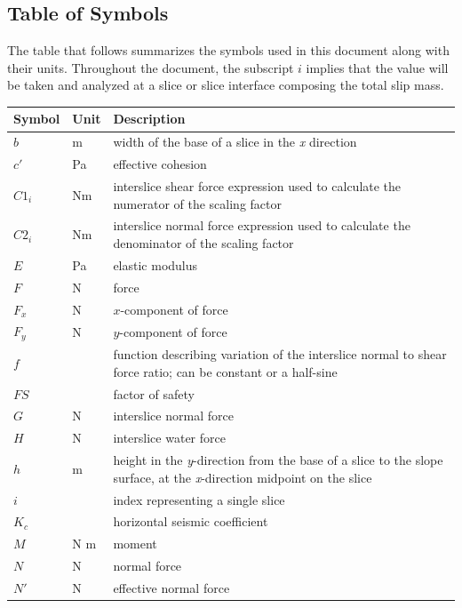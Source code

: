 \documentclass[12pt]{article}
\renewcommand{\arraystretch}{1}
\begin{document}
\subsection{Table of Symbols}


The table that follows summarizes the symbols used in this document along with 
their units. 
Throughout the document, the subscript $i$ implies that the value will be taken 
and analyzed at a slice or slice interface composing the total slip mass.

\renewcommand{\arraystretch}{1.6}
\setlength{\tabcolsep}{20pt}
\begin{longtable*}{  l  l  p{8.5cm}  }
\hline
\textbf{Symbol} & \textbf{Unit} & \textbf{Description} \\
\hline
$b$ & \si{\meter}& width of the base of a slice in the \textit{x} direction
\\
$c'$ & \si{\pascal} & effective cohesion 
\\
${C1_{i}}$ &  N\si{\meter}& interslice shear force expression used to calculate 
the numerator of the scaling factor
\\
${C2_{i}}$ &  N\si{\meter}& interslice normal force expression used to 
calculate the denominator of the scaling factor
\\
$E$ & \si{\pascal} & elastic modulus
\\
$F$ &\si{\newton} & force
\\
${F_{x}}$ & \si{\newton} &$x$-component of force
\\
${F_{y}}$ & \si{\newton} &$y$-component of force
\\
$f$ & & function describing variation of the interslice normal to shear force 
ratio; can be constant or a half-sine
\\
$FS$ & & factor of safety
\\
$G$ & \si{\newton} & interslice normal force
\\
$H$ & \si{\newton} & interslice water force
\\
$h$ &  \si{\meter}& height in the \textit{y}-direction from the base of a slice 
to the slope surface, at the \textit{x}-direction midpoint on the slice
\\
$i$ & & index representing a single slice 
\\
${K_{c}}$ & & horizontal seismic coefficient
\\
$M$ & N \si{\meter}& moment
\\
$N$ & \si{\newton} & normal force
\\
$N'$ &\si{\newton} & effective normal force

\end{longtable*}
\end{document}
